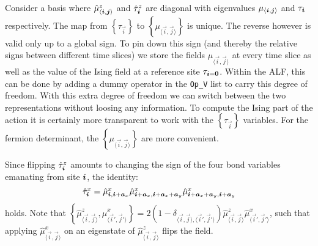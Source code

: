 Consider a basis where  $\hat{\mu}^{z}_{ \langle  \boldsymbol{i}, \boldsymbol{j}  \rangle } $ and $  \hat{\tau}^{z}_{ \boldsymbol{i}}$  are diagonal with eigenvalues  $\mu_{ \langle  \boldsymbol{i}, \boldsymbol{j}  \rangle } $ and $  {\tau}_{ \boldsymbol{i}}$  respectively. 
The map from  $ \left\{ \tau_{\vec{i}}  \right\} $ to $ \left\{ \mu_{\langle \vec{i}, \vec{j} \rangle } \right\} $  is unique.
The reverse however  is valid only up to a global sign.
To pin down this sign (and thereby  the  relative signs between different time slices)  we store the fields $ \mu_{\langle \vec{i},\vec{j} \rangle } $ at every time slice as well as the value of the Ising field at a reference site $\tau_{\boldsymbol{i} = \boldsymbol{0}}$. Within the ALF, this can be done by adding a dummy operator in the \texttt{Op\_V} list to carry this degree of freedom.    With this extra degree of freedom we can switch  between the two representations without loosing any information.   To compute the Ising part of the action it is certainly more transparent to work  with the $ \left\{ \tau_{\vec{i}}  \right\} $  variables. For the  fermion determinant,  the $ \left\{ \mu_{\langle \vec{i}, \vec{j} \rangle } \right\} $   are more convenient.

Since flipping  $\hat{\tau}^{z}_{ \boldsymbol{i}} $  amounts to changing the sign of the four  bond variables emanating from site $\boldsymbol{i}$, the identity:
\begin{equation}
\hat{\tau}^x_{\boldsymbol{i}}  = \hat{\mu}^{x}_{\boldsymbol{i},\boldsymbol{i} + \boldsymbol{a}_x } \hat{\mu}^{x}_{\boldsymbol{i} + \boldsymbol{a}_x, \boldsymbol{i} + \boldsymbol{a}_x + \boldsymbol{a}_y }   \hat{\mu}^{x}_{\boldsymbol{i} + \boldsymbol{a}_x + \boldsymbol{a}_y, \boldsymbol{i} + \boldsymbol{a}_y  }
\end{equation}
holds.  
Note that $\left\{ \hat{\mu}^{z}_{\langle \vec{i}, \vec{j} \rangle} , \hat{\mu}^x_{\langle \vec{i}', \vec{j}'  \rangle} \right\}  =  2 \left( 1 -  \delta_{\langle \vec{i}, \vec{j}  \rangle, \langle \vec{i}', \vec{j}'  \rangle } \right) 
\hat{\mu}^{z}_{\langle \vec{i}, \vec{j} \rangle}  \hat{\mu}^x_{\langle \vec{i}', \vec{j}'  \rangle} $, such that applying $\hat{\mu}^x_{\langle \vec{i}, \vec{j}  \rangle}$  on an eigenstate of  $\hat{\mu}^{z}_{\langle \vec{i}, \vec{j} \rangle}$  flips the field. 



